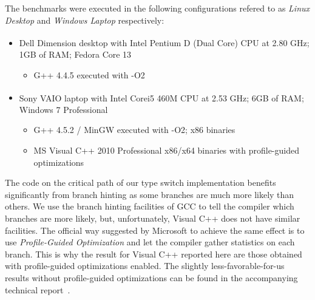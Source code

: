 \documentclass[preprint]{sigplanconf}
\begin{document}
The benchmarks were executed in the following configurations refered to as 
\emph{Linux Desktop} and \emph{Windows Laptop} respectively:

\begin{itemize}
\setlength{\itemsep}{0pt}
\setlength{\parskip}{0pt}
\item Dell Dimension\textsuperscript{\textregistered} desktop with Intel\textsuperscript{\textregistered} Pentium\textsuperscript{\textregistered} 
      D (Dual Core) CPU at 2.80 GHz; 1GB of RAM; Fedora Core 13  
      \begin{itemize}
      \setlength{\itemsep}{0pt}
      \setlength{\parskip}{0pt}
      \item G++ 4.4.5 executed with -O2
      \end{itemize}
\item Sony VAIO\textsuperscript{\textregistered} laptop with Intel\textsuperscript{\textregistered} Core\texttrademark i5 460M 
      CPU at 2.53 GHz; 6GB of RAM; Windows 7 Professional
      \begin{itemize}
      \setlength{\itemsep}{0pt}
      \setlength{\parskip}{0pt}
      \item G++ 4.5.2 / MinGW executed with -O2; x86 binaries
      \item MS Visual C++ 2010 Professional x86/x64 binaries with profile-guided optimizations
      \end{itemize}
\end{itemize}

\noindent
The code on the critical path of our type switch implementation benefits 
significantly from branch hinting as some branches are much more likely than 
others. We use the branch hinting facilities of GCC to tell the compiler which 
branches are more likely, but, unfortunately, Visual C++ does not have similar 
facilities. The official way suggested by Microsoft to achieve the same effect 
is to use \emph{Profile-Guided Optimization} and let the compiler gather 
statistics on each branch. This is why the result for Visual C++ reported here 
are those obtained with profile-guided optimizations enabled. The slightly 
less-favorable-for-us results without profile-guided optimizations can be found 
in the accompanying technical report~\cite{TR}.
\end{document}
